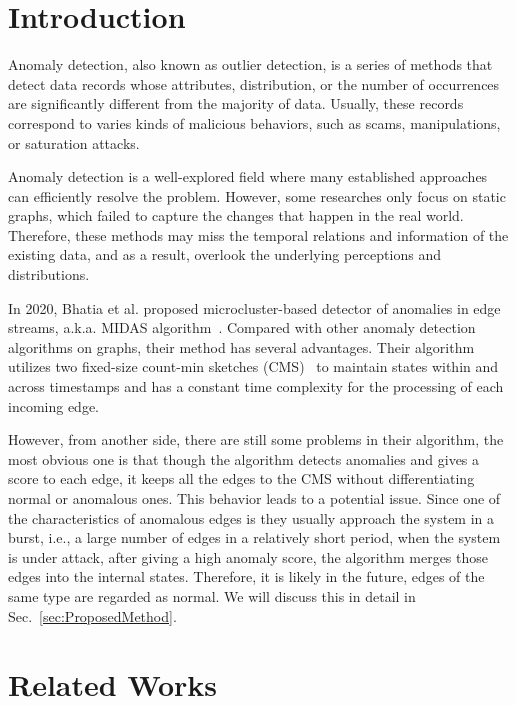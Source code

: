 \documentclass[5p]{elsarticle}
\begin{document}
	\linenumbers


	\section{Introduction}\label{sec:Introduction}

	Anomaly detection, also known as outlier detection, is a series of methods that detect data records whose attributes, distribution, or the number of occurrences are significantly different from the majority of data. Usually, these records correspond to varies kinds of malicious behaviors, such as scams, manipulations, or saturation attacks.

	Anomaly detection is a well-explored field where many established approaches can efficiently resolve the problem. However, some researches only focus on static graphs, which failed to capture the changes that happen in the real world. Therefore, these methods may miss the temporal relations and information of the existing data, and as a result, overlook the underlying perceptions and distributions.

	In 2020, Bhatia et al. proposed microcluster-based detector of anomalies in edge streams, a.k.a. MIDAS algorithm~\cite{bhatia2020midas}. Compared with other anomaly detection algorithms on graphs, their method has several advantages. Their algorithm utilizes two fixed-size count-min sketches (CMS)~\cite{cormode2005an} to maintain states within and across timestamps and has a constant time complexity for the processing of each incoming edge.

	However, from another side, there are still some problems in their algorithm, the most obvious one is that though the algorithm detects anomalies and gives a score to each edge, it keeps all the edges to the CMS without differentiating normal or anomalous ones. This behavior leads to a potential issue. Since one of the characteristics of anomalous edges is they usually approach the system in a burst, i.e., a large number of edges in a relatively short period, when the system is under attack, after giving a high anomaly score, the algorithm merges those edges into the internal states. Therefore, it is likely in the future, edges of the same type are regarded as normal. We will discuss this in detail in Sec.~\ref{sec:ProposedMethod}.


	\section{Related Works}\label{sec:RelatedWorks}
\end{document}
